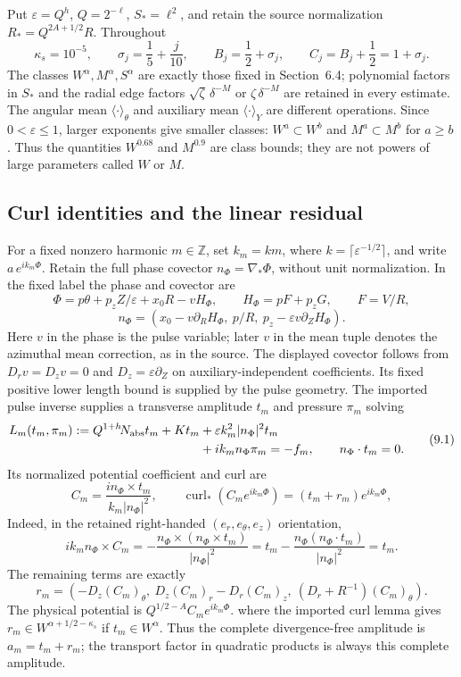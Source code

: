 \documentclass[10pt,a4paper]{article}
\begin{document}
Put $\varepsilon=Q^h$, $Q=2^{-\ell}$, $S_*=\ell^2$, and retain the source
normalization $R_*=Q^{2A+1/2}R$.  Throughout
\[
  \kappa_s=10^{-5},\qquad \sigma_j=\frac{1}{5}+\frac{j}{10},\qquad
  B_j=\frac{1}{2}+\sigma_j,\qquad C_j=B_j+\frac{1}{2}=1+\sigma_j .
\]
The classes $W^\alpha,M^\alpha,S^\alpha$ are exactly those fixed in
Section~6.4; polynomial factors in $S_*$ and the radial edge factors
$\sqrt\zeta\,\delta^{-M}$ or $\zeta\,\delta^{-M}$ are retained in every
estimate.  The angular mean $\langle\cdot\rangle_\theta$ and auxiliary mean
$\langle\cdot\rangle_Y$ are different operations.
Since $0<\varepsilon\le1$, larger exponents give smaller classes:
$W^a\subset W^b$ and $M^a\subset M^b$ for $a\ge b$. Thus the quantities
$W^{0.68}$ and $M^{0.9}$ are class bounds; they are not powers of large
parameters called $W$ or $M$.

\subsection{Curl identities and the linear residual}
\label{subsec:stage9-linear}

For a fixed nonzero harmonic $m\in\mathbb Z$, set $k_m=km$, where
$k=\lceil\varepsilon^{-1/2}\rceil$, and write $a\,e^{ik_m\Phi}$.
Retain the full phase covector $n_\Phi=\nabla_*\Phi$, without unit
normalization. In the fixed label the phase and covector are
\[
\Phi=p\theta+p_zZ/\varepsilon+x_0R-vH_\Phi,\qquad
H_\Phi=pF+p_zG,\qquad F=V/R,
\]
\[
n_\Phi=(x_0-v\partial_RH_\Phi,\ p/R,\
p_z-\varepsilon v\partial_ZH_\Phi).
\]
Here $v$ in the phase is the pulse variable; later $v$ in the mean tuple
denotes the azimuthal mean correction, as in the source. The displayed
covector follows from $D_rv=D_zv=0$ and $D_z=\varepsilon\partial_Z$
on auxiliary-independent coefficients. Its fixed positive lower length
bound is supplied by the pulse geometry.
The imported pulse inverse supplies a transverse amplitude $t_m$ and pressure
$\pi_m$ solving
\begin{equation}
 \begin{aligned}
 L_m(t_m,\pi_m):=Q^{1+h}\!N_{\rm abs}t_m+K t_m
 &+\varepsilon k_m^2|n_\Phi|^2t_m\\
 &+ik_m n_\Phi\pi_m=-f_m,\qquad n_\Phi\cdot t_m=0 .
 \end{aligned}                         \tag{9.1}
\end{equation}
Its normalized potential coefficient and curl are
\[
 C_m=\frac{i n_\Phi\times t_m}{k_m|n_\Phi|^2},\qquad
\operatorname{curl}_*(C_me^{ik_m\Phi})=(t_m+r_m)e^{ik_m\Phi},
\]
Indeed, in the retained right-handed $(e_r,e_\theta,e_z)$ orientation,
\[
ik_m n_\Phi\times C_m
=-\frac{n_\Phi\times(n_\Phi\times t_m)}{|n_\Phi|^2}
=t_m-\frac{n_\Phi(n_\Phi\cdot t_m)}{|n_\Phi|^2}=t_m.
\]
The remaining terms are exactly
\[
r_m=(-D_z(C_m)_\theta,\
D_z(C_m)_r-D_r(C_m)_z,\
(D_r+R^{-1})(C_m)_\theta).
\]
The physical potential is $Q^{1/2-A}C_me^{ik_m\Phi}$.
where the imported curl lemma gives $r_m\in W^{\alpha+1/2-\kappa_s}$ if
$t_m\in W^\alpha$.  Thus the complete divergence-free amplitude is
$a_m=t_m+r_m$; the transport factor in quadratic products is always this
complete amplitude.
\end{document}
